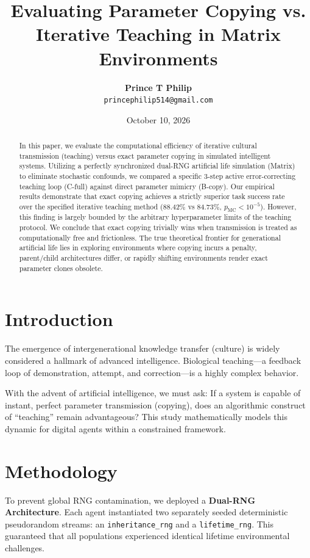 \documentclass[12pt]{article}
\title{\textbf{Evaluating Parameter Copying vs. Iterative Teaching in Matrix Environments}}
\author{\textbf{Prince T Philip} \\ \texttt{princephilip514@gmail.com}}
\date{October 10, 2026}
\begin{document}
\maketitle

\begin{abstract}
In this paper, we evaluate the computational efficiency of iterative cultural transmission (teaching) versus exact parameter copying in simulated intelligent systems. Utilizing a perfectly synchronized dual-RNG artificial life simulation (Matrix) to eliminate stochastic confounds, we compared a specific 3-step active error-correcting teaching loop (C-full) against direct parameter mimicry (B-copy). Our empirical results demonstrate that exact copying achieves a strictly superior task success rate over the specified iterative teaching method (88.42\% vs 84.73\%, $p_{\mathrm{MC}} < 10^{-5}$). However, this finding is largely bounded by the arbitrary hyperparameter limits of the teaching protocol. We conclude that exact copying trivially wins when transmission is treated as computationally free and frictionless. The true theoretical frontier for generational artificial life lies in exploring environments where copying incurs a penalty, parent/child architectures differ, or rapidly shifting environments render exact parameter clones obsolete.
\end{abstract}

\section{Introduction}
The emergence of intergenerational knowledge transfer (culture) is widely considered a hallmark of advanced intelligence. Biological teaching---a feedback loop of demonstration, attempt, and correction---is a highly complex behavior.

With the advent of artificial intelligence, we must ask: If a system is capable of instant, perfect parameter transmission (copying), does an algorithmic construct of ``teaching'' remain advantageous? This study mathematically models this dynamic for digital agents within a constrained framework. 

\section{Methodology}
To prevent global RNG contamination, we deployed a \textbf{Dual-RNG Architecture}. Each agent instantiated two separately seeded deterministic pseudorandom streams: an \texttt{inheritance\_rng} and a \texttt{lifetime\_rng}. This guaranteed that all populations experienced identical lifetime environmental challenges.
\end{document}
